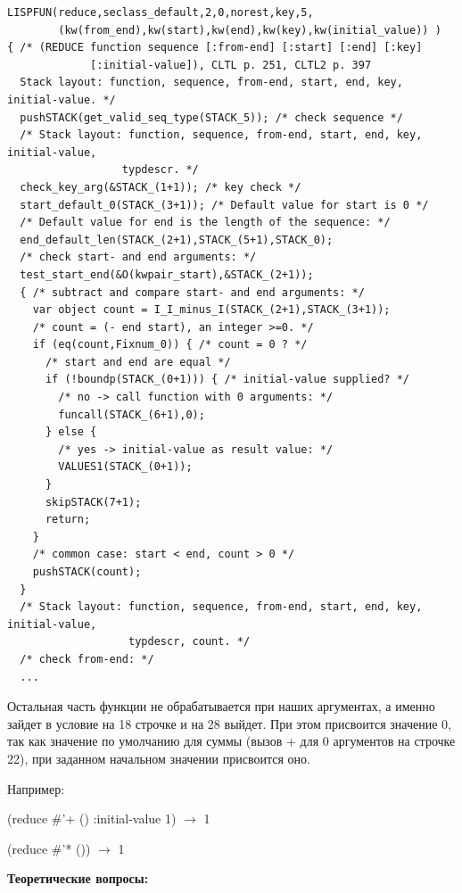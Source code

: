 \documentclass[a4paper,14pt]{extreport} %
\begin{document}
\begin{enumerate}
\begin{lstlisting}[basicstyle=\footnotesize]
LISPFUN(reduce,seclass_default,2,0,norest,key,5,
        (kw(from_end),kw(start),kw(end),kw(key),kw(initial_value)) )
{ /* (REDUCE function sequence [:from-end] [:start] [:end] [:key]
             [:initial-value]), CLTL p. 251, CLTL2 p. 397
  Stack layout: function, sequence, from-end, start, end, key, initial-value. */
  pushSTACK(get_valid_seq_type(STACK_5)); /* check sequence */
  /* Stack layout: function, sequence, from-end, start, end, key, initial-value,
                  typdescr. */
  check_key_arg(&STACK_(1+1)); /* key check */
  start_default_0(STACK_(3+1)); /* Default value for start is 0 */
  /* Default value for end is the length of the sequence: */
  end_default_len(STACK_(2+1),STACK_(5+1),STACK_0);
  /* check start- and end arguments: */
  test_start_end(&O(kwpair_start),&STACK_(2+1));
  { /* subtract and compare start- and end arguments: */
    var object count = I_I_minus_I(STACK_(2+1),STACK_(3+1));
    /* count = (- end start), an integer >=0. */
    if (eq(count,Fixnum_0)) { /* count = 0 ? */
      /* start and end are equal */
      if (!boundp(STACK_(0+1))) { /* initial-value supplied? */
        /* no -> call function with 0 arguments: */
        funcall(STACK_(6+1),0);
      } else {
        /* yes -> initial-value as result value: */
        VALUES1(STACK_(0+1));
      }
      skipSTACK(7+1);
      return;
    }
    /* common case: start < end, count > 0 */
    pushSTACK(count);
  }
  /* Stack layout: function, sequence, from-end, start, end, key, initial-value,
                   typdescr, count. */
  /* check from-end: */
  ...
\end{lstlisting}

Остальная часть функции не обрабатывается при наших аргументах, а именно зайдет в условие на 18 строчке и на 28 выйдет. При этом присвоится значение 0, так как значение по умолчанию для суммы (вызов + для 0 аргументов на строчке 22), при заданном начальном значении присвоится оно. 

Например:

(reduce $\#$'+ () :initial-value 1) $\to$ 1

(reduce $\#$'* ()) $\to$ 1

\end{enumerate}

\textbf{Теоретические вопросы:}
\end{document}
